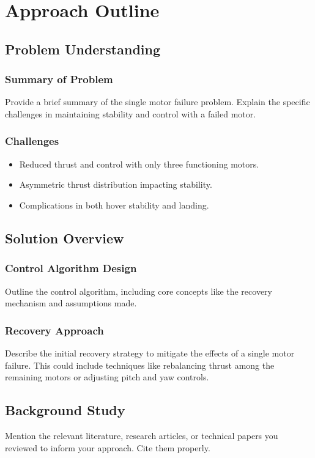 \chapter{Approach Outline}

    \section{Problem Understanding}
    \subsection{Summary of Problem}
    Provide a brief summary of the single motor failure problem. Explain the specific challenges in maintaining stability and control with a failed motor.

    \subsection{Challenges}
    \begin{itemize}
        \item Reduced thrust and control with only three functioning motors.
        \item Asymmetric thrust distribution impacting stability.
        \item Complications in both hover stability and landing.
    \end{itemize}

    \section{Solution Overview}
    \subsection{Control Algorithm Design}
    Outline the control algorithm, including core concepts like the recovery mechanism and assumptions made.

    \subsection{Recovery Approach}
    Describe the initial recovery strategy to mitigate the effects of a single motor failure. This could include techniques like rebalancing thrust among the remaining motors or adjusting pitch and yaw controls.

    \section{Background Study}
    Mention the relevant literature, research articles, or technical papers you reviewed to inform your approach. Cite them properly.

